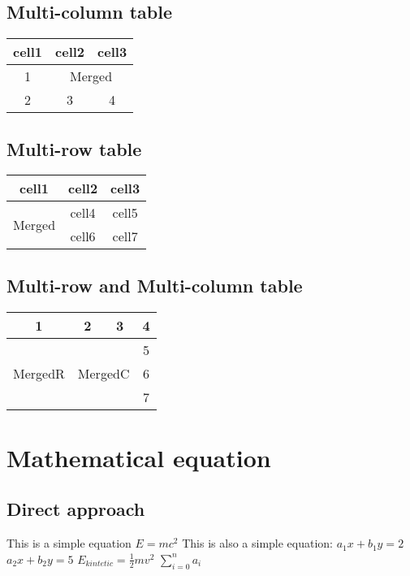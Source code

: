 \documentclass[14pt]{article}
\begin{document}
\subsection{Multi-column table}
\begin{tabular}{|c|c|c|}
    \hline
    cell1 & cell2 & cell3\\
    \hline
    1 & \multicolumn{2}{c|}{Merged}\\
    \hline
    2 & 3 & 4\\
    \hline
\end{tabular}
\subsection{Multi-row table}
\begin{tabular}{|c|c|c|}
    \hline
    cell1 & cell2 & cell3\\
    \hline
    \multirow{2}{*}{Merged} & cell4 & cell5\\
    \cline{2-3}
    & cell6 & cell7\\
    \hline
\end{tabular}
\subsection{Multi-row and Multi-column table}
\begin{tabular}{|c|c|c|c|}
    \hline
    1 & 2 & 3 & 4\\
    \hline
    \multirow{3}{*}{MergedR}
    & \multicolumn{2}{c|}{\multirow{3}{*}{MergedC}} & 5\\
    \cline{4-4}
    & \multicolumn{2}{c|}{} & 6\\
    \cline{4-4}
    & \multicolumn{2}{c|}{} & 7\\
    \hline
\end{tabular}
\section{Mathematical equation}
\subsection{Direct approach}
This is a simple equation $E = mc^2$\newline
This is also a simple equation:\newline 
$a_1x + b_1y = 2$\newline
$a_2x + b_2y = 5$ \newline
$E_{kintetic} = \frac{1}{2}mv^2$\newline
$\sum_{i=0}^n a_i$ \newline
\end{document}
